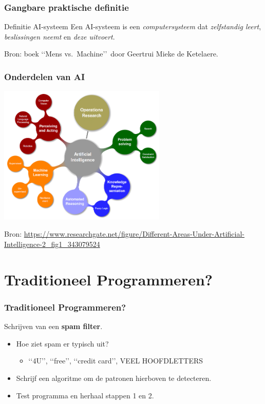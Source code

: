 \documentclass[aspectratio=169]{beamer}
\begin{document}
\begin{frame}
\frametitle{Gangbare praktische definitie}

\begin{block}{Definitie AI-systeem}
Een AI-systeem is een {\emph{computersysteem}} dat {\emph{zelfstandig leert}}, {\emph{beslissingen neemt}}
en {\emph{deze uitvoert}}.
\end{block}

Bron: boek \lq\lq Mens vs.\ Machine\rq\rq\ door Geertrui Mieke de Ketelaere.	
\end{frame}

\begin{frame}
\frametitle{Onderdelen van AI}
\begin{center}
\includegraphics[width=0.6\textwidth]{graphics/areas-of-ai}
\end{center}
\tiny {Bron: \url{https://www.researchgate.net/figure/Different-Areas-Under-Artificial-Intelligence-2_fig1_343079524}}
\end{frame}

\section{Traditioneel Programmeren?}

\begin{frame}
\frametitle{Traditioneel Programmeren?}

Schrijven van een \textbf{spam filter}.

\begin{itemize}
\item Hoe ziet spam er typisch uit?
\pause
\begin{itemize}
	\item \lq\lq 4U\rq\rq, \lq\lq free\rq\rq, \lq\lq credit card\rq\rq, VEEL HOOFDLETTERS
\end{itemize}	
\item Schrijf een algoritme om de patronen hierboven te detecteren.
\item Test programma en herhaal stappen 1 en 2.
\end{itemize}

\end{frame}
\end{document}
